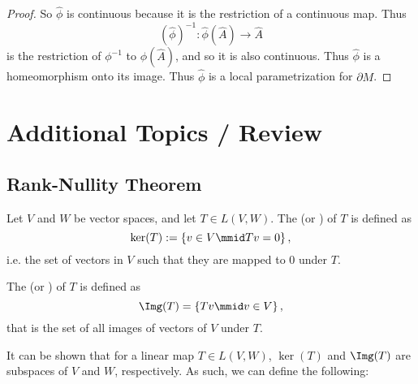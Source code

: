 \documentclass[notoc,notitlepage]{tufte-book}
\begin{document}
\begin{proof}
  So $\hat{\phi}$ is continuous because it is the restriction of a continuous
  map. Thus
  \begin{equation*}
    (\hat{\phi})^{-1} : \hat{\phi}(\hat{A}) \to \hat{A}
  \end{equation*}
  is the restriction of $\phi^{-1}$ to $\phi(\hat{A})$, and so it is also
  continuous. Thus $\hat{\phi}$ is a homeomorphism onto its image. Thus
  $\hat{\phi}$ is a local parametrization for $\partial M$.
\end{proof}



\appendix

\chapter{Additional Topics / Review}%
\label{chp:additional_topics_review}

\section{Rank-Nullity Theorem}%
\label{sec:rank_nullity_theorem}

\nocite{stephen2002}

\begin{defn}\label{defn:kernel_and_image}
  Let $V$ and $W$ be vector spaces, and let $T \in L(V, W)$.
  The  (or ) of $T$ is defined as
  \begin{equation*}
    \ker(T) := \left\{ v \in V \mmid Tv = 0 \right\},
  \end{equation*}
  i.e. the set of vectors in $V$ such that they are mapped to $0$ under $T$.

  The  (or ) of $T$ is defined as
  \begin{equation*}
    \Img(T) = \left\{ Tv \mmid v \in V \right\},
  \end{equation*}
  that is the set of all images of vectors of $V$ under $T$.
\end{defn}

It can be shown that for a linear map $T \in L(V, W)$,
$\ker (T)$ and $\Img(T)$ are subspaces of $V$ and $W$, respectively.
As such, we can define the following:
\end{document}
